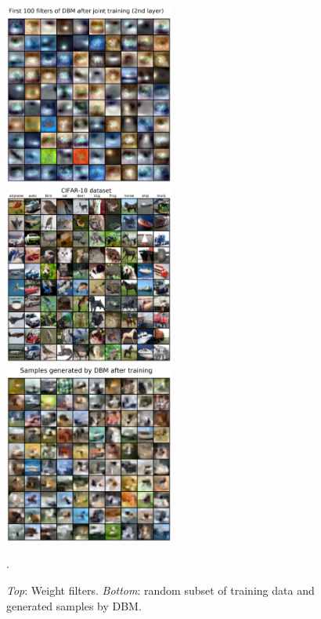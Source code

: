 \begin{figure}[h]
\begin{mdframed}
\quad
\includegraphics[width=2.2in]{dbm-cifar-latest/W2_joint.png}
\\[2em]
\includegraphics[width=2.2in]{dbm-cifar-latest/cifar10.png}
\quad
\includegraphics[width=2.2in]{dbm-cifar-latest/samples.png}
\caption{\emph{Top}: Weight filters. \emph{Bottom}: random subset of training data and generated samples by DBM.}.
\end{mdframed}
\end{figure}

